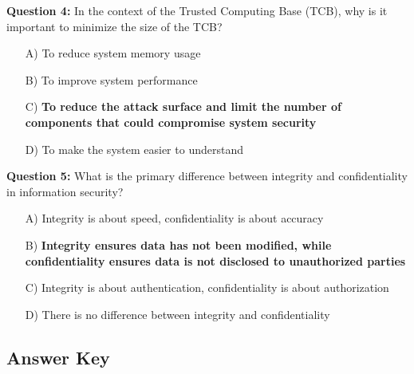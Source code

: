 \textbf{Question 4:} In the context of the Trusted Computing Base (TCB), why is it important to minimize the size of the TCB?

\begin{enumerate}
    \item[A)] To reduce system memory usage
    \item[B)] To improve system performance
    \item[C)] \textbf{To reduce the attack surface and limit the number of components that could compromise system security}
    \item[D)] To make the system easier to understand
\end{enumerate}

\textbf{Question 5:} What is the primary difference between integrity and confidentiality in information security?

\begin{enumerate}
    \item[A)] Integrity is about speed, confidentiality is about accuracy
    \item[B)] \textbf{Integrity ensures data has not been modified, while confidentiality ensures data is not disclosed to unauthorized parties}
    \item[C)] Integrity is about authentication, confidentiality is about authorization
    \item[D)] There is no difference between integrity and confidentiality
\end{enumerate}

\subsection{Answer Key}

